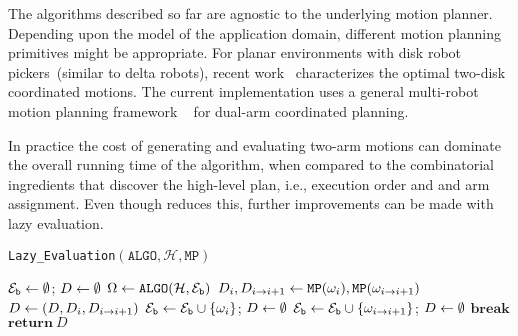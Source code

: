 The algorithms described so far are agnostic to the underlying motion planner.
Depending upon the model of the application domain, different motion planning primitives might be appropriate. For planar environments with disk robot pickers~(similar to delta robots), recent work~\cite{kirkpatrick2016characterizing} characterizes the optimal two-disk coordinated motions. The current implementation uses a general multi-robot motion planning framework \drrtstar~\cite{Dobson:2017aa,Shome2019} for dual-arm coordinated planning.


In practice the cost of generating and evaluating two-arm motions can dominate the overall running time of the algorithm, when compared to the combinatorial ingredients that discover the high-level plan, i.e., execution order and and arm assignment. Even though \algo reduces this, further improvements can be made with lazy evaluation. 

  \begin{algorithm}[t]
  \caption{{\tt Lazy\_Evaluation}$ (\mathtt{ALGO}, \mathcal{H}, \mathtt{MP}) $}
  \label{algo:lazy}
  $ \mathcal{E}_{\mathtt{b}}\leftarrow\emptyset $;  $ D \leftarrow \emptyset $\;
  {
      $ {{\Omega}}\leftarrow \mathtt{ALGO} ( \mathcal{H},   \mathcal{E}_{\mathtt{b}}  ) $\;
      {
          $ D_i,D_{i\rightarrow i+1} \leftarrow \mathtt{MP}({\omega}_i), \mathtt{MP}( {\omega}_{i\rightarrow{i+1}} ) $\;
          $ D\leftarrow (D,D_i,D_{i\rightarrow i+1} ) $\;
          {
              $ \mathcal{E}_{\mathtt{b}} \leftarrow \mathcal{E}_{\mathtt{b}}\cup \{{\omega}_i\}$; $ D \leftarrow \emptyset$\;
          }
          {
              $ \mathcal{E}_{\mathtt{b}} \leftarrow \mathcal{E}_{\mathtt{b}}\cup \{{\omega}_{i\rightarrow{i+1}}\}$; $D \leftarrow \emptyset $\;
          }
          \lIf{$ \D=\emptyset $}
          {
          $\mathbf{break}$
          }
      }
  }
  $\mathbf{return}\ D$
  \end{algorithm}

